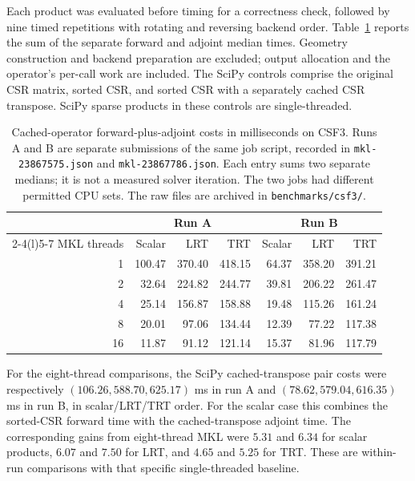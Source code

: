 \documentclass[11pt,a4paper]{article}
\begin{document}
Each product was evaluated before timing for a correctness check, followed
by nine timed repetitions with rotating and reversing backend order.
Table~\ref{tab:csf3-mkl} reports the sum of the separate forward and adjoint
median times. Geometry construction and backend preparation are excluded;
output allocation and the operator's per-call work are included. The
SciPy controls comprise the original CSR matrix, sorted CSR, and sorted
CSR with a separately cached CSR transpose. SciPy sparse products in these
controls are single-threaded.

\begin{table}[htbp]
\centering\small
\begin{tabular}{@{}r rrr rrr@{}}
\toprule
& \multicolumn{3}{c}{Run A} & \multicolumn{3}{c}{Run B} \\
\cmidrule(lr){2-4}\cmidrule(l){5-7}
MKL threads & Scalar & LRT & TRT & Scalar & LRT & TRT \\
\midrule
1  & 100.47 & 370.40 & 418.15 & 64.37 & 358.20 & 391.21 \\
2  &  32.64 & 224.82 & 244.77 & 39.81 & 206.22 & 261.47 \\
4  &  25.14 & 156.87 & 158.88 & 19.48 & 115.26 & 161.24 \\
8  &  20.01 &  97.06 & 134.44 & 12.39 &  77.22 & 117.38 \\
16 &  11.87 &  91.12 & 121.14 & 15.37 &  81.96 & 117.79 \\
\bottomrule
\end{tabular}
\caption{Cached-operator forward-plus-adjoint costs in milliseconds on
CSF3. Runs A and B are separate submissions of the same job script,
recorded in \texttt{mkl-23867575.json} and \texttt{mkl-23867786.json}.
Each entry sums two separate medians; it is not a measured solver iteration.
The two jobs had different permitted CPU sets. The raw files are archived
in \texttt{benchmarks/csf3/}.}
\label{tab:csf3-mkl}
\end{table}

For the eight-thread comparisons, the SciPy cached-transpose pair costs
were respectively $(106.26,588.70,625.17)$ ms in run A and
$(78.62,579.04,616.35)$ ms in run B, in scalar/LRT/TRT order. For the scalar
case this combines the sorted-CSR forward time with the cached-transpose
adjoint time. The corresponding gains from eight-thread MKL were
$5.31$ and $6.34$ for scalar products, $6.07$ and $7.50$ for LRT, and
$4.65$ and $5.25$ for TRT. These are within-run comparisons with that
specific single-threaded baseline.
\end{document}
